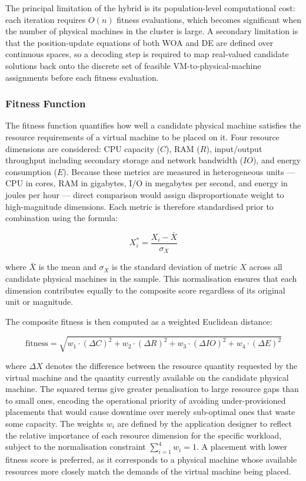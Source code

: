 \documentclass[a4paper, 12pt]{report}
\begin{document}
\noindent The principal limitation of the hybrid is its population-level
computational cost: each iteration requires $O(n)$ fitness evaluations,
which becomes significant when the number of physical machines in the
cluster is large.  A secondary limitation is that the position-update
equations of both WOA and DE are defined over continuous spaces, so a
decoding step is required to map real-valued candidate solutions back
onto the discrete set of feasible VM-to-physical-machine assignments
before each fitness evaluation.
 
\subsubsection{Fitness Function}
 
The fitness function quantifies how well a candidate physical machine
satisfies the resource requirements of a virtual machine to be placed
on it.  Four resource dimensions are considered: CPU capacity ($C$),
RAM ($R$), input/output throughput including secondary storage and
network bandwidth ($IO$), and energy consumption ($E$).  Because these
metrics are measured in heterogeneous units --- CPU in cores, RAM in
gigabytes, I/O in megabytes per second, and energy in joules per hour
--- direct comparison would assign disproportionate weight to
high-magnitude dimensions.  Each metric is therefore standardised prior
to combination using the formula:
 
$$X_i^* = \frac{X_i - \bar{X}}{\sigma_X}$$
 
where $\bar{X}$ is the mean and $\sigma_X$ is the standard deviation
of metric $X$ across all candidate physical machines in the sample.
This normalisation ensures that each dimension contributes equally to
the composite score regardless of its original unit or magnitude.
 
The composite fitness is then computed as a weighted Euclidean distance:
 
$$\text{fitness} = \sqrt{w_1 \cdot (\Delta C)^2 + w_2 \cdot (\Delta R)^2
                       + w_3 \cdot (\Delta IO)^2 + w_4 \cdot (\Delta E)^2}$$
 
where $\Delta X$ denotes the difference between the resource quantity
requested by the virtual machine and the quantity currently available on
the candidate physical machine.  The squared terms give greater penalisation
to large resource gaps than to small ones, encoding the operational priority
of avoiding under-provisioned placements that would cause downtime over
merely sub-optimal ones that waste some capacity.  The weights $w_i$
are defined by the application designer to reflect the relative importance
of each resource dimension for the specific workload, subject to the
normalisation constraint $\sum_{i=1}^{4} w_i = 1$.  A placement with
lower fitness score is preferred, as it corresponds to a physical machine
whose available resources more closely match the demands of the virtual
machine being placed.
 
\end{document}
